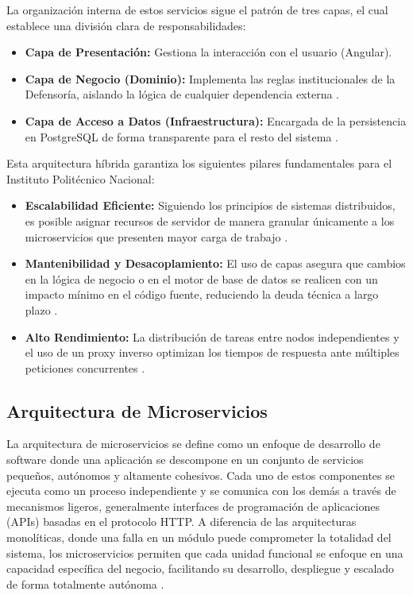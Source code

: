 La organización interna de estos servicios sigue el patrón de tres capas, el cual establece una división clara de responsabilidades:
\begin{itemize}
\item \textbf{Capa de Presentación:} Gestiona la interacción con el usuario (Angular).
\item \textbf{Capa de Negocio (Dominio):} Implementa las reglas institucionales de la Defensoría, aislando la lógica de cualquier dependencia externa \cite{33}.
\item \textbf{Capa de Acceso a Datos (Infraestructura):} Encargada de la persistencia en PostgreSQL de forma transparente para el resto del sistema \cite{33} .
\end{itemize}

Esta arquitectura híbrida garantiza los siguientes pilares fundamentales para el Instituto Politécnico Nacional:
\begin{itemize}
\item \textbf{Escalabilidad Eficiente:} Siguiendo los principios de sistemas distribuidos, es posible asignar recursos de servidor de manera granular únicamente a los microservicios que presenten mayor carga de trabajo \cite{29} .
\item \textbf{Mantenibilidad y Desacoplamiento:} El uso de capas asegura que cambios en la lógica de negocio o en el motor de base de datos se realicen con un impacto mínimo en el código fuente, reduciendo la deuda técnica a largo plazo \cite{33} .
\item \textbf{Alto Rendimiento:} La distribución de tareas entre nodos independientes y el uso de un proxy inverso optimizan los tiempos de respuesta ante múltiples peticiones concurrentes \cite{29}.
\end{itemize}

\subsection{Arquitectura de Microservicios}

La arquitectura de microservicios se define como un enfoque de desarrollo de software donde una aplicación se descompone en un conjunto de servicios pequeños, autónomos y altamente cohesivos. Cada uno de estos componentes se ejecuta como un proceso independiente y se comunica con los demás a través de mecanismos ligeros, generalmente interfaces de programación de aplicaciones (APIs) basadas en el protocolo HTTP. A diferencia de las arquitecturas monolíticas, donde una falla en un módulo puede comprometer la totalidad del sistema, los microservicios permiten que cada unidad funcional se enfoque en una capacidad específica del negocio, facilitando su desarrollo, despliegue y escalado de forma totalmente autónoma \cite{31}.

